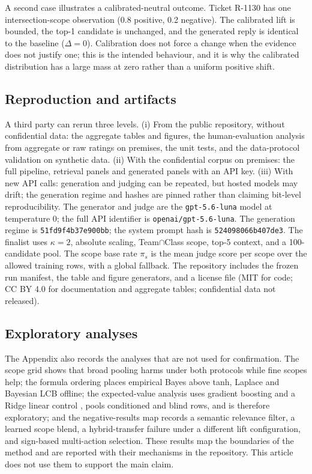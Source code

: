 A second case illustrates a calibrated-neutral outcome. Ticket R-1130 has one
intersection-scope observation (0.8 positive, 0.2 negative). The calibrated lift is
bounded, the top-1 candidate is unchanged, and the generated reply is identical to
the baseline ($\Delta=0$). Calibration does not force a change when the evidence
does not justify one; this is the intended behaviour, and it is why the calibrated
distribution has a large mass at zero rather than a uniform positive shift.

\subsection{Reproduction and artifacts}
\label{sec:repro}
A third party can rerun three levels. (i) From the public repository, without
confidential data: the aggregate tables and figures, the human-evaluation analysis
from aggregate or raw ratings on premises, the unit tests, and the data-protocol
validation on synthetic data. (ii) With the confidential corpus on premises: the
full pipeline, retrieval panels and generated panels with an API key. (iii) With new
API calls: generation and judging can be repeated, but hosted models may drift; the
generation regime and hashes are pinned rather than claiming bit-level
reproducibility. The generator and judge are the \texttt{gpt-5.6-luna} model at
temperature 0; the full API identifier is \mbox{\texttt{openai/gpt-5.6-luna}}.
The generation regime is \texttt{51fd9f4b37e900bb}; the system
prompt hash is \texttt{524098066b407de3}. The finalist uses $\kappa=2$, absolute
scaling, Team$\cap$Class scope, top-5 context, and a 100-candidate pool. The
scope base rate $\pi_s$ is the mean judge score per scope over the allowed training
rows, with a global fallback. The repository includes the frozen run manifest, the
table and figure generators, and a license file (MIT for code; CC BY 4.0 for
documentation and aggregate tables; confidential data not released).

\subsection{Exploratory analyses}
The Appendix also records the analyses that are not used for confirmation. The
scope grid shows that broad pooling harms under both protocols while fine scopes
help; the formula ordering places empirical Bayes above tanh, Laplace and Bayesian
LCB offline; the expected-value analysis uses gradient boosting \cite{b23} and a
Ridge linear control \cite{b24}, pools conditioned and blind rows, and is therefore
exploratory; and the negative-results map records a semantic relevance
filter, a learned scope blend, a hybrid-transfer failure under a different lift
configuration, and sign-based multi-action selection. These results map the
boundaries of the method and are reported with their mechanisms in the repository.
This article does not use them to support the main claim.
